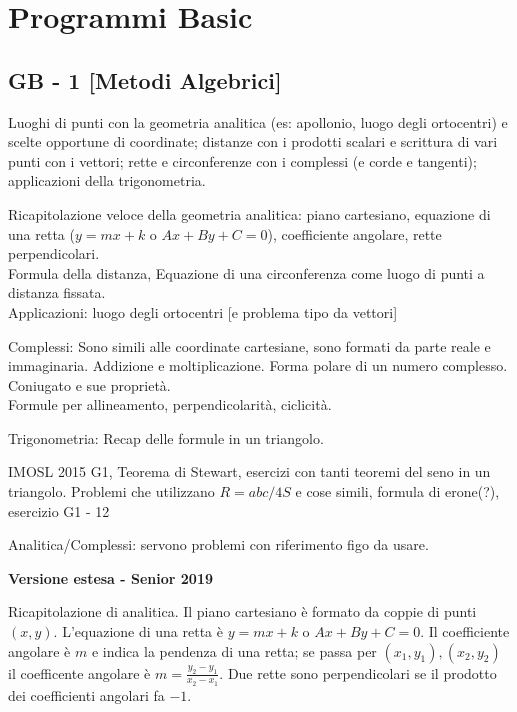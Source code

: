 \section{Programmi Basic}

\subsection{GB - 1 [Metodi Algebrici]}
\begin{short}
 Luoghi di punti con la geometria analitica (es: apollonio, luogo degli ortocentri) e scelte opportune di coordinate; distanze con i prodotti scalari e scrittura di vari punti con i vettori; rette e circonferenze con i complessi (e corde e tangenti); applicazioni della trigonometria.
\end{short}

Ricapitolazione veloce della geometria analitica: piano cartesiano, equazione di una retta ($y=mx+k$ o $Ax+By+C=0$), coefficiente angolare, rette perpendicolari.\\
Formula della distanza, Equazione di una circonferenza come luogo di punti a distanza fissata.\\
Applicazioni: luogo degli ortocentri [e problema tipo da vettori]

Complessi: Sono simili alle coordinate cartesiane, sono formati da parte reale e immaginaria. Addizione e moltiplicazione. Forma polare di un numero complesso. Coniugato e sue proprietà. \\
Formule per allineamento, perpendicolarità, ciclicità.



Trigonometria: Recap delle formule in un triangolo. 

IMOSL 2015 G1, Teorema di Stewart, esercizi con tanti teoremi del seno in un triangolo. 
Problemi che utilizzano $R=abc/4S$ e cose simili, formula di erone(?), esercizio G1 - 12

Analitica/Complessi: servono problemi con riferimento figo da usare.



\vspace{0.3cm}
\large{\textbf{Versione estesa - Senior 2019}}\normalsize

Ricapitolazione di analitica. Il piano cartesiano è formato da coppie di punti $(x,y)$. L'equazione di una retta è $y=mx+k$ o $Ax+By+C=0$. Il coefficiente angolare è $m$ e indica la pendenza di una retta; se passa per $(x_1,y_1),(x_2,y_2)$ il coefficente angolare è $m=\frac{y_2-y_1}{x_2-x_1}$. Due rette sono perpendicolari se il prodotto dei coefficienti angolari fa $-1$.\\

